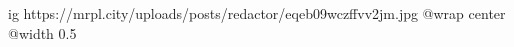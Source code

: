  
 
 
 
 

\ifcmt
  ig https://mrpl.city/uploads/posts/redactor/eqeb09wczffvv2jm.jpg
  @wrap center
  @width 0.5
\fi
